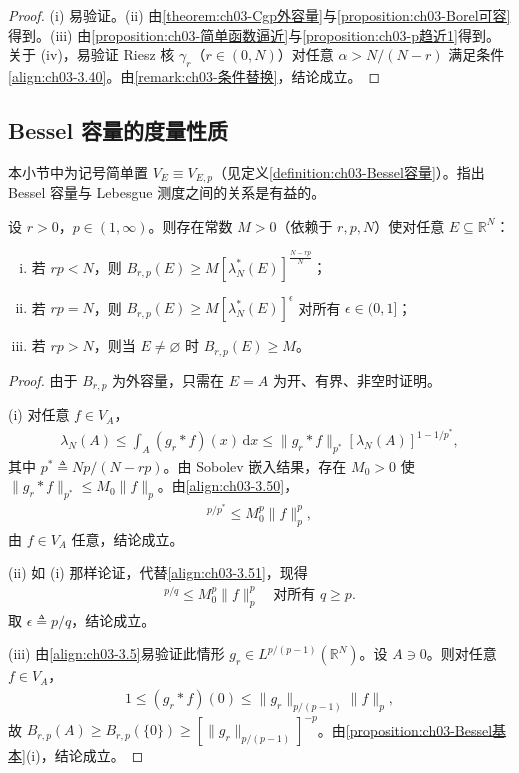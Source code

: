 \documentclass[../../main.tex]{subfiles}%
\begin{document}
\begin{proof}
(i) 易验证。(ii) 由\cref{theorem:ch03-Cgp外容量}与\cref{proposition:ch03-Borel可容}得到。(iii) 由\cref{proposition:ch03-简单函数逼近}与\cref{proposition:ch03-p趋近1}得到。关于 (iv)，易验证 Riesz 核 $\gamma_r$（$r\in(0,N)$）对任意 $\alpha>N/(N-r)$ 满足条件\eqref{align:ch03-3.40}。由\cref{remark:ch03-条件替换}，结论成立。
\end{proof}

\subsection{Bessel 容量的度量性质}\label{subsection:ch03-度量性质}

本小节中为记号简单置 $V_E\equiv V_{E,p}$（见定义\ref{definition:ch03-Bessel容量}）。指出 Bessel 容量与 Lebesgue 测度之间的关系是有益的。

\begin{proposition}\label{proposition:ch03-点容量}
设 $r>0$，$p\in(1,\infty)$。则存在常数 $M>0$（依赖于 $r,p,N$）使对任意 $E\subseteq\mathbb{R}^N$：
\begin{enumerate}[(i)]
\item 若 $rp<N$，则 $B_{r,p}(E)\geqslant M[\lambda_N^*(E)]^{\frac{N-rp}{N}}$；
\item 若 $rp=N$，则 $B_{r,p}(E)\geqslant M[\lambda_N^*(E)]^\epsilon$ 对所有 $\epsilon\in(0,1]$；
\item 若 $rp>N$，则当 $E\neq\varnothing $ 时 $B_{r,p}(E)\geqslant M$。
\end{enumerate}
\end{proposition}

\begin{proof}
由于 $B_{r,p}$ 为外容量，只需在 $E=A$ 为开、有界、非空时证明。

(i) 对任意 $f\in V_A$，
\begin{align}
\lambda_N(A)\leqslant\int_A(g_r*f)(x)\,\mathrm{d}x
\leqslant\|g_r*f\|_{p^*}[\lambda_N(A)]^{1-1/p^*},\label{align:ch03-3.50}
\end{align}
其中 $p^*\triangleq Np/(N-rp)$。由 Sobolev 嵌入结果，存在 $M_0>0$ 使 $\|g_r*f\|_{p^*}\leqslant M_0\|f\|_p$。由\eqref{align:ch03-3.50}，
\begin{align}
[\lambda_N(A)]^{p/p^*}\leqslant M_0^p\|f\|_p^p,\label{align:ch03-3.51}
\end{align}
由 $f\in V_A$ 任意，结论成立。

(ii) 如 (i) 那样论证，代替\eqref{align:ch03-3.51}，现得
\begin{align*}
[\lambda_N(A)]^{p/q}\leqslant M_0^p\|f\|_p^p
\quad \text{对所有 }q\geqslant p.
\end{align*}
取 $\epsilon\triangleq p/q$，结论成立。

(iii) 由\eqref{align:ch03-3.5}易验证此情形 $g_r\in L^{p/(p-1)}(\mathbb{R}^N)$。设 $A\ni0$。则对任意 $f\in V_A$，
\begin{align*}
1\leqslant(g_r*f)(0)\leqslant\|g_r\|_{p/(p-1)}\|f\|_p,
\end{align*}
故 $B_{r,p}(A)\geqslant B_{r,p}(\{0\})\geqslant[\|g_r\|_{p/(p-1)}]^{-p}$。由\cref{proposition:ch03-Bessel基本}(i)，结论成立。
\end{proof}
\end{document}
